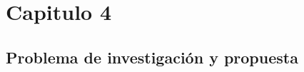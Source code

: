 \chapter*{Capitulo 4}\label{ch:problemainvestigacion}

\section{Problema de investigación y propuesta}








